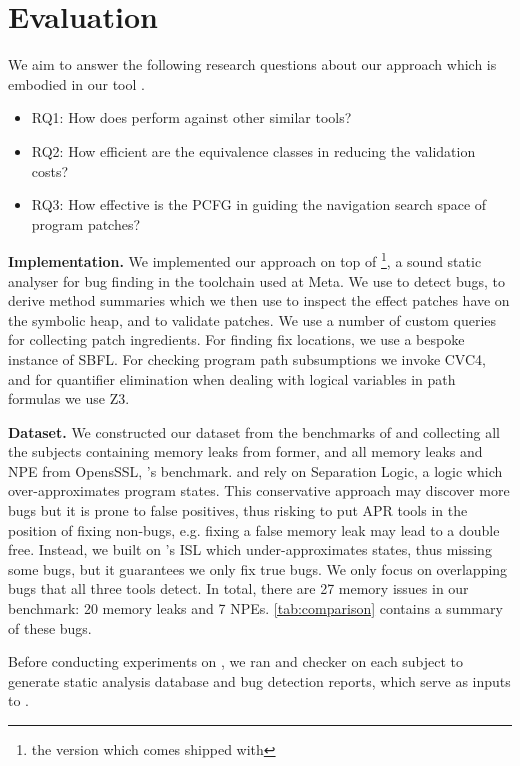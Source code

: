 \section{Evaluation}

We aim to answer the following research questions about our approach which is embodied in our tool \tool.
\begin{itemize}
    \item RQ1: How does \tool perform against other similar tools?
    \item RQ2: How efficient are the equivalence classes in reducing the validation costs?
    \item RQ3: How effective is the PCFG in guiding the navigation search space of program patches?
\end{itemize}

\textbf{Implementation.} We implemented our approach on top of \pulse\footnote{the version which comes shipped with \ourinfer}, a sound static analyser for bug finding in the \infertool toolchain used at Meta. We use \pulse to detect bugs, to derive method summaries which we then use to inspect the effect patches have on the symbolic heap, and to validate patches. 
We use a number of custom \codeql queries for collecting patch ingredients.
For finding fix locations, we use a bespoke instance of SBFL. 
For checking program path subsumptions we invoke CVC4, and for quantifier elimination when dealing with logical variables in path formulas we use Z3.

\textbf{Dataset.} We constructed our dataset from the benchmarks of \saver \cite{Le2022} and \pulse \cite{HongLLO20} 
collecting all the subjects containing memory leaks from former, and all memory leaks and NPE from OpensSSL, \pulse's benchmark.
 \saver and \footpatch rely on Separation Logic, a logic which over-approximates program states.
 This conservative approach may discover more bugs but it is prone to false positives, thus risking to put APR tools in the position of fixing non-bugs, e.g. fixing a false memory leak may lead to a double free. Instead, we built on \pulse's ISL which under-approximates states, thus missing some bugs, but it guarantees we only fix true bugs.
We only focus on overlapping bugs that all three tools  detect. 
In total, there are 27 memory issues in our benchmark: 20 memory leaks and 7 NPEs.  \autoref{tab:comparison} contains a summary of these bugs.

Before conducting experiments on \tool, we ran \codeql and \pulse checker on each subject to generate static analysis database and bug detection reports, which serve as inputs to \tool.



